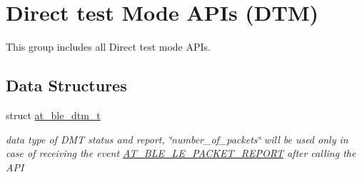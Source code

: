 \hypertarget{group__dtm__group}{}\section{Direct test Mode A\+P\+Is (D\+TM)}
\label{group__dtm__group}


This group includes all Direct test mode A\+P\+Is.  


\subsection*{Data Structures}
\begin{DoxyCompactItemize}
\item 
struct \mbox{\hyperlink{structat__ble__dtm__t}{at\+\_\+ble\+\_\+dtm\+\_\+t}}
\begin{DoxyCompactList}\small\item\em data type of D\+MT status and report, \char`\"{}number\+\_\+of\+\_\+packets\char`\"{} will be used only in case of receiving the event \mbox{\hyperlink{at__ble__api_8h_a3324640b95f33169515f89738ed5baebad529dc56000832da6054a10c8689d099}{A\+T\+\_\+\+B\+L\+E\+\_\+\+L\+E\+\_\+\+P\+A\+C\+K\+E\+T\+\_\+\+R\+E\+P\+O\+RT}} after calling the A\+PI \end{DoxyCompactList}\end{DoxyCompactItemize}

